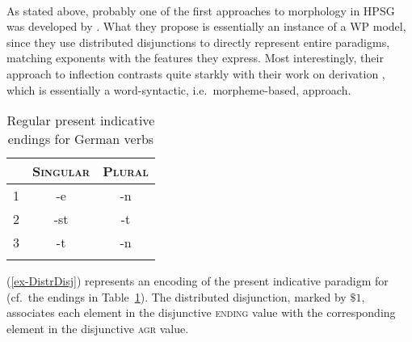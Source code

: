 \documentclass[output=paper
 	        ,biblatex
                ,babelshorthands
                ,newtxmath
                ,draftmode
                ,colorlinks, citecolor=brown
]{langscibook}
\begin{document}

\paragraph*{\citet{Krieger:Nerbonne:93}}
As stated above, probably one of the first approach\-es to morphology
in HPSG was developed by \citet{Krieger:Nerbonne:93}. What they
propose is essentially an instance of a WP model, since they use
distributed disjunctions to directly represent entire paradigms,
matching exponents with the features they express. Most interestingly,
their approach to inflection contrasts quite starkly with their
work on derivation \citep{Krieger:Nerbonne:93}, which is essentially a
word-syntactic, i.e.\ morpheme-based, approach.


\begin{table}
  \centering
  \begin{tabular}{r|cc}
    \lsptoprule
    & \textsc{Singular} & \textsc{Plural}\\
    \midrule
    1 & -e & -n\\
    2 & -st & -t\\
    3 & -t & -n\\
    \lspbottomrule
  \end{tabular}
  \caption{Regular present indicative endings for  German verbs}
  \label{tab:GermanEndings}
\end{table}

(\ref{ex-DistrDisj}) represents an encoding of the present
indicative paradigm for  (cf.\ the endings in Table~\ref{tab:GermanEndings}). The distributed disjunction, marked by ${\$
  1}$, associates each element in the disjunctive \textsc{ending}
value with the corresponding element in the disjunctive \textsc{agr}
value. 



  
\end{document}
